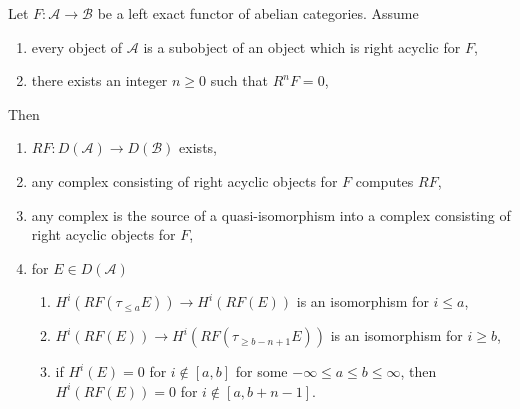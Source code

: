 \begin{lemma}
\label{lemma-unbounded-right-derived}
Let $F : \mathcal{A} \to \mathcal{B}$ be a left exact functor of
abelian categories. Assume
\begin{enumerate}
\item every object of $\mathcal{A}$ is a subobject of an object
which is right acyclic for $F$,
\item there exists an integer $n \geq 0$ such that $R^nF = 0$,
\end{enumerate}
Then
\begin{enumerate}
\item $RF : D(\mathcal{A}) \to D(\mathcal{B})$ exists,
\item any complex consisting of right acyclic objects for $F$ computes $RF$,
\item any complex is the source of a quasi-isomorphism into a complex
consisting of right acyclic objects for $F$,
\item for $E \in D(\mathcal{A})$
\begin{enumerate}
\item $H^i(RF(\tau_{\leq a}E)) \to H^i(RF(E))$ is an isomorphism
for $i \leq a$,
\item $H^i(RF(E)) \to H^i(RF(\tau_{\geq b - n + 1}E))$ is an isomorphism
for $i \geq b$,
\item if $H^i(E) = 0$ for $i \not \in [a, b]$ for some
$-\infty \leq a \leq b \leq \infty$, then $H^i(RF(E)) = 0$
for $i \not \in [a, b + n - 1]$.
\end{enumerate}
\end{enumerate}
\end{lemma}

